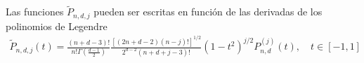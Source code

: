 \begin{rem}\label{note:fun_leg}Las funciones $	\tilde{P}_{n,d,j}$ pueden ser escritas en función de las derivadas de los polinomios de Legendre 
	\begin{gather*}
	\tilde{P}_{n,d,j}(t) =\frac{(n+d-3)!}{n!\Gamma(\frac{d-1}{2})} \frac{[(2n+d-2)(n-j)!]^{1/2}}{2^{d-2}(n+d+j-3)!}(1-t^2)^{j/2}P^{(j)}_{n,d}(t), \quad t\in[-1,1]
	\end{gather*}
\end{rem}